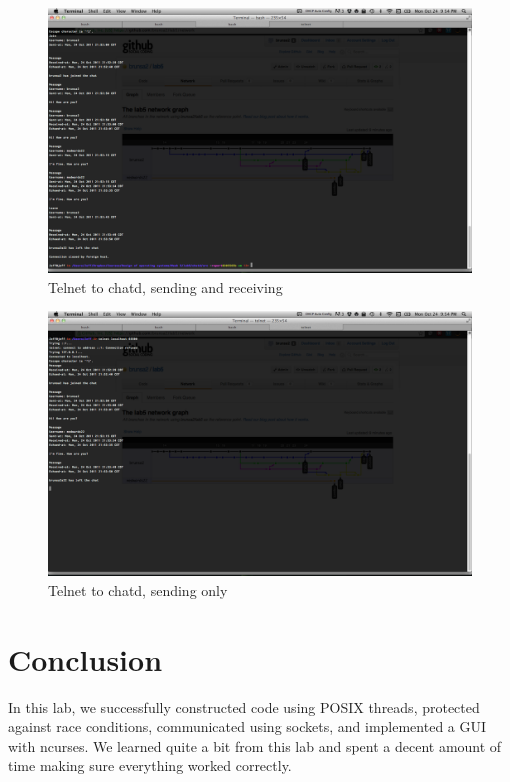 \documentclass{article}
\begin{document}
\begin{figure}[!h]
\begin{center}
\includegraphics[scale=0.2]{send.png}
\end{center}
\caption{Telnet to chatd, sending and receiving}
\label{chatd-send}
\end{figure}

\begin{figure}[!h]
\begin{center}
\includegraphics[scale=0.2]{receive.png}
\end{center}
\caption{Telnet to chatd, sending only}
\label{chatd-receive}
\end{figure}

\section*{Conclusion}
In this lab, we successfully constructed code using POSIX threads, protected against race conditions, communicated using sockets, and implemented a GUI with ncurses. We learned quite a bit from this lab and spent a decent amount of time making sure everything worked correctly.
\end{document}
